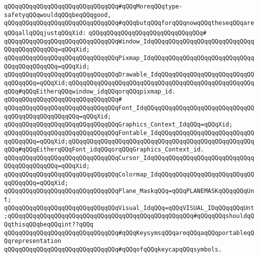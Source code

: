 \newline
\verb|qQQqqQQqqQQqqQQqqQQqqQQqqQQqqQQq#qQQqMoreqQQqtype-safetyqQQqwouldqQQqbeqQQqgood,|\newline
\verb|qQQqqQQqqQQqqQQqqQQqqQQqqQQqqQQq#qQQqbutqQQqforqQQqnowqQQqtheseqQQqareqQQqallqQQqjustqQQqXid:|\newline
\verb|qQQqqQQqqQQqqQQqqQQqqQQqqQQqqQQq#|\newline
\verb|qQQqqQQqqQQqqQQqqQQqqQQqqQQqqQQqWindow_IdqQQqqQQqqQQqqQQqqQQqqQQqqQQqqQQqqQQqqQQqqQQq=qQQqXid;|\newline
\verb|qQQqqQQqqQQqqQQqqQQqqQQqqQQqqQQqPixmap_IdqQQqqQQqqQQqqQQqqQQqqQQqqQQqqQQqqQQqqQQqqQQq=qQQqXid;|\newline
\verb|qQQqqQQqqQQqqQQqqQQqqQQqqQQqqQQqDrawable_IdqQQqqQQqqQQqqQQqqQQqqQQqqQQqqQQqqQQq=qQQqXid;qQQqqQQqqQQqqQQqqQQqqQQqqQQqqQQqqQQqqQQqqQQqqQQqqQQqqQQq#qQQqEitherqQQqwindow_idqQQqorqQQqpixmap_id.|\newline
\verb|qQQqqQQqqQQqqQQqqQQqqQQqqQQqqQQq#|\newline
\verb|qQQqqQQqqQQqqQQqqQQqqQQqqQQqqQQqFont_IdqQQqqQQqqQQqqQQqqQQqqQQqqQQqqQQqqQQqqQQqqQQqqQQqqQQq=qQQqXid;|\newline
\verb|qQQqqQQqqQQqqQQqqQQqqQQqqQQqqQQqGraphics_Context_IdqQQq=qQQqXid;|\newline
\verb|qQQqqQQqqQQqqQQqqQQqqQQqqQQqqQQqFontable_IdqQQqqQQqqQQqqQQqqQQqqQQqqQQqqQQqqQQq=qQQqXid;qQQqqQQqqQQqqQQqqQQqqQQqqQQqqQQqqQQqqQQqqQQqqQQqqQQqqQQq#qQQqEitherqQQqFont_idqQQqorqQQqGraphics_Context_id.|\newline
\verb|qQQqqQQqqQQqqQQqqQQqqQQqqQQqqQQqCursor_IdqQQqqQQqqQQqqQQqqQQqqQQqqQQqqQQqqQQqqQQqqQQq=qQQqXid;|\newline
\verb|qQQqqQQqqQQqqQQqqQQqqQQqqQQqqQQqColormap_IdqQQqqQQqqQQqqQQqqQQqqQQqqQQqqQQqqQQq=qQQqXid;|\newline
\newline
\verb|qQQqqQQqqQQqqQQqqQQqqQQqqQQqqQQqPlane_MaskqQQq=qQQqPLANEMASKqQQqqQQqUnt;|\newline
\newline
\verb|qQQqqQQqqQQqqQQqqQQqqQQqqQQqqQQqVisual_IdqQQq=qQQqVISUAL_IDqQQqqQQqUnt;qQQqqQQqqQQqqQQqqQQqqQQqqQQqqQQqqQQqqQQqqQQqqQQqqQQq#qQQqqQQqshouldqQQqthisqQQqbeqQQqint??qQQq|\newline
\newline
\verb|qQQqqQQqqQQqqQQqqQQqqQQqqQQqqQQq#qQQqKeysymsqQQqareqQQqaqQQqportableqQQqrepresentation|\newline
\verb|qQQqqQQqqQQqqQQqqQQqqQQqqQQqqQQq#qQQqofqQQqkeycapqQQqsymbols.|\newline
